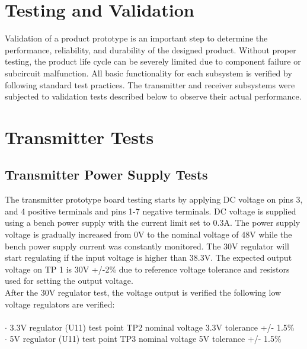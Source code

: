 \documentclass[12pt]{article}
\begin{document}
\section{Testing and Validation}
\indent
Validation of a product prototype is an important step to determine the performance, reliability, and durability of the designed product. Without proper testing, the product life cycle can be severely limited due to component failure or subcircuit malfunction.  All basic functionality for each subsystem is verified by following standard test practices. The transmitter and receiver subsystems were subjected to validation tests described below to observe their actual performance. 

\pagebreak

\section*{Transmitter Tests} %
\subsection{Transmitter Power Supply Tests}
\indent
The transmitter prototype board testing starts by applying DC voltage on pins 3, and 4 positive terminals and pins 1-7 negative terminals. DC voltage is supplied using a bench power supply with the current limit set to 0.3A. The power supply voltage is gradually increased from 0V to the nominal voltage of 48V while the bench power supply current was constantly monitored.
The 30V regulator will start regulating if the input voltage is higher than 38.3V. The expected output voltage on TP 1 is 30V +/-2\% due to reference voltage tolerance and resistors used for setting the output voltage.\\

\noindent
After the 30V regulator test, the voltage output is verified the following low voltage regulators are verified:\\
\hfill \\
\indent \indent $\cdot$ 3.3V regulator (U11) test point TP2 nominal voltage 3.3V  tolerance +/- 1.5\% \\
\indent \indent $\cdot$ 5V regulator (U11) test point TP3 nominal voltage 5V  tolerance +/- 1.5\%\\
\end{document}
